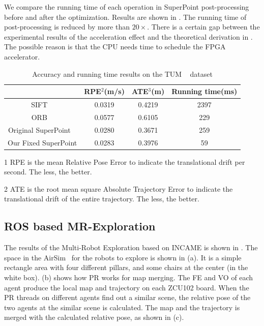 We compare the running time of each operation in SuperPoint post-processing before and after the optimization. Results are shown in . The running time of post-processing is reduced by more than $20\times$. There is a certain gap between the experimental results of the acceleration effect and the theoretical derivation in . The possible reason is that the CPU needs time to schedule the FPGA accelerator.

\begin{table}[t]
  \centering
  \caption{ Accuracy and running time results on the TUM ~\cite{sturm12iros} dataset  }
  \footnotesize
  \begin{threeparttable}
\begin{tabular}{|c|c|c|c|} 
  \hline
        & RPE$^2$(m/s) & ATE$^3$(m)  & Running time(ms) \bigstrut\\
  \hline
  SIFT  ~\cite{Lowe-478}  & 0.0319  & 0.4219 & 2397  \bigstrut\\
  \hline
  ORB  ~\cite{Mur-Artal:2017281}  & 0.0577  & 0.6105 & 229  \bigstrut\\
  \hline
  Original SuperPoint  ~\cite{detone2018superpoint} & 0.0280  & 0.3671 & 259  \bigstrut\\
  \hline
  Our Fixed SuperPoint  & 0.0283  & 0.3976 & 59  \bigstrut\\
  \hline
  \end{tabular}%
  

\begin{tablenotes}
  \item[1] RPE is the mean Relative Pose Error to indicate the translational drift per second. The less, the better.
  \item[2] ATE is the root mean square Absolute Trajectory Error to indicate the translational drift of the entire trajectory. The less, the better.
\end{tablenotes}
    \end{threeparttable}
  \label{tab:VO}%
\end{table}%

\subsection{ ROS based MR-Exploration }

The results of the Multi-Robot Exploration based on INCAME is shown in . The space in the AirSim~\cite{shah2018airsim} for the robots to explore is shown in (a). It is a simple rectangle area with four different pillars, and some chairs at the center (in the white box).  (b) shows how PR works for map merging. The FE and VO of each agent produce the local map and trajectory on each ZCU102 board. When the PR threads on different agents find out a similar scene, the relative pose of the two agents at the similar scene is calculated. The map and the trajectory is merged with the calculated relative pose, as shown in (c).


